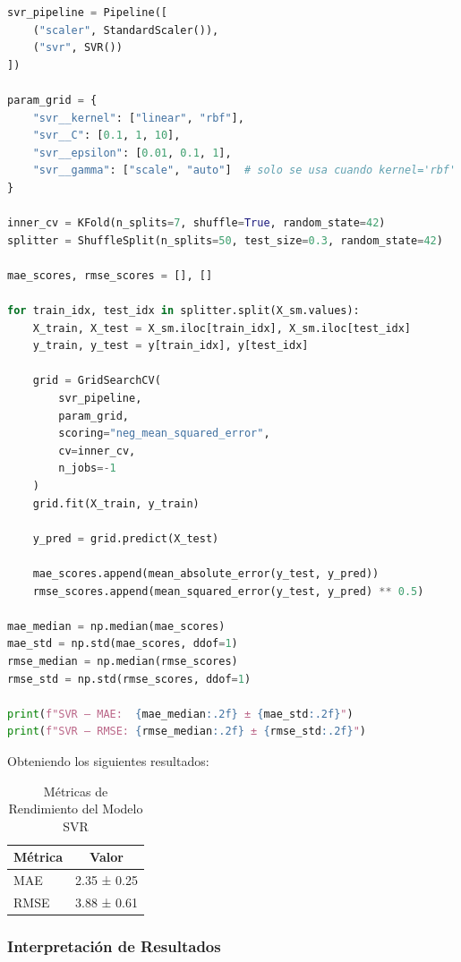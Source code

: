 \documentclass[12pt,a4paper]{article}
\begin{document}
\begin{lstlisting}[language=Python, frame=single, basicstyle=\ttfamily\small, breaklines=true]
svr_pipeline = Pipeline([
    ("scaler", StandardScaler()),
    ("svr", SVR())
])

param_grid = {
    "svr__kernel": ["linear", "rbf"],
    "svr__C": [0.1, 1, 10],
    "svr__epsilon": [0.01, 0.1, 1],
    "svr__gamma": ["scale", "auto"]  # solo se usa cuando kernel='rbf'
}

inner_cv = KFold(n_splits=7, shuffle=True, random_state=42)
splitter = ShuffleSplit(n_splits=50, test_size=0.3, random_state=42)

mae_scores, rmse_scores = [], []

for train_idx, test_idx in splitter.split(X_sm.values):
    X_train, X_test = X_sm.iloc[train_idx], X_sm.iloc[test_idx]
    y_train, y_test = y[train_idx], y[test_idx]

    grid = GridSearchCV(
        svr_pipeline,
        param_grid,
        scoring="neg_mean_squared_error",
        cv=inner_cv,
        n_jobs=-1
    )
    grid.fit(X_train, y_train)

    y_pred = grid.predict(X_test)

    mae_scores.append(mean_absolute_error(y_test, y_pred))
    rmse_scores.append(mean_squared_error(y_test, y_pred) ** 0.5)

mae_median = np.median(mae_scores)
mae_std = np.std(mae_scores, ddof=1)
rmse_median = np.median(rmse_scores)
rmse_std = np.std(rmse_scores, ddof=1)

print(f"SVR – MAE:  {mae_median:.2f} ± {mae_std:.2f}")
print(f"SVR – RMSE: {rmse_median:.2f} ± {rmse_std:.2f}")
\end{lstlisting}

Obteniendo los siguientes resultados:

\begin{table}[H]
\centering
\caption{Métricas de Rendimiento del Modelo SVR}\label{tab:svr_resultados}
\begin{tabular}{lc}
\toprule
\textbf{Métrica} & \textbf{Valor} \\
\midrule
MAE & 2.35 ± 0.25 \\
RMSE & 3.88 ± 0.61 \\
\bottomrule
\end{tabular}
\end{table}

\subsubsection{Interpretación de Resultados}
\end{document}
